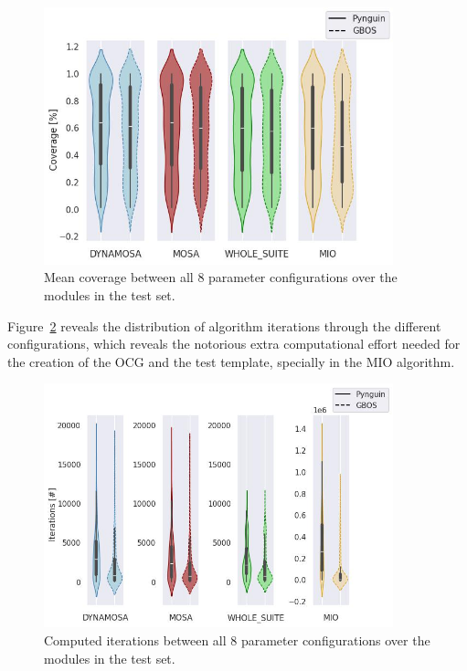 \documentclass[%
  chapterprefix=false,%
  open=right,%
  twoside=true,%
  paper=a4,%
  logofile={Figures/logo.png},%
  thesistype=master,%
  UKenglish,%
]{se2thesis}
\begin{document}
\begin{figure}[bth]
  \centering
  \includegraphics[width=0.9\textwidth]{Figures/Results/Coverage.jpg}
  \caption{Mean coverage between all 8 parameter configurations over the modules in the test set.}\label{fig:coverage}
\end{figure}

Figure~\ref{fig:iterations} reveals the distribution of algorithm iterations through the different configurations, which reveals the notorious extra computational effort needed for the creation of the OCG and the test template, specially in the MIO algorithm.

\begin{figure}[bth]
  \centering
  \includegraphics[width=0.9\textwidth]{Figures/Results/AlgorithmIterations.jpg}
  \caption{Computed iterations between all 8 parameter configurations over the modules in the test set.}\label{fig:iterations}
\end{figure}
\end{document}
